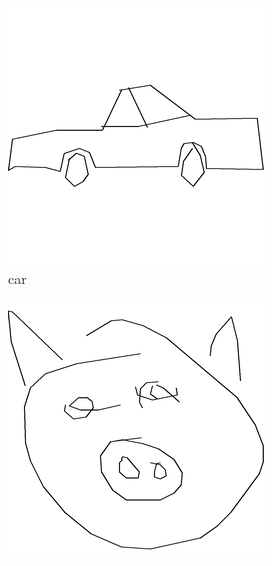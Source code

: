 \documentclass[a4paper, twocolumn]{article}
\begin{document}
    \begin{figure}[H]
    \begin{subfigure}{.33\columnwidth}
        \centering
        \includegraphics[width=.9\textwidth]{figures/doodle1.png}
        \caption{car}
        \label{fig:doodle1}
    \end{subfigure}%
    \begin{subfigure}{.33\columnwidth}
        \centering
        \includegraphics[width=.9\textwidth]{figures/doodle2.png}

\end{subfigure}
\end{figure}
\end{document}
